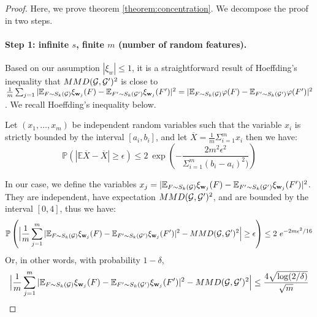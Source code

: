 \begin{proof}
Here, we prove theorem \ref{theorem:concentration}. We decompose the proof in two steps.

\paragraph{Step 1: infinite $s$, finite $m$ (number of random features).} Based on our assumption $|\xi_w|\leq 1$, it is a straightforward result of Hoeffding's inequality that  $MMD(\mathcal{G}, \mathcal{G}')^2$ is close to $\frac{1}{m} \sum_{j=1} | \mathbb{E}_{F \sim S_k(\mathcal{G})} \xi_{\mathbf{w}_j}(F) - \mathbb{E}_{F' \sim S_k(\mathcal{G}')} \xi_{\mathbf{w}_j}(F') |^2 = | \mathbb{E}_{F \sim S_k(\mathcal{G})} \varphi(F) - \mathbb{E}_{F' \sim S_k(\mathcal{G}')} \varphi(F') |^2$. We recall Hoeffding's inequality below.
\begin{lemma} 
Let $(x_1,\ldots, x_m)$ be independent random variables such that the variable $x_i$ is strictly bounded by the interval $[a_i , b_i]$, and let $\overline{X}=\frac{1}{m}\Sigma_{i=1}^{m}x_i$ then we have:
\begin{equation}
\label{eq:Hoeffding}
    \mathbb{P}(|\mathbb{E}\overline{X}-\overline{X}|\geq \epsilon)\leq 2~ \exp \left(-\frac{2m^2\epsilon^2}{\Sigma_{i=1}^m(b_i-a_i)^2)} \right)
\end{equation}
\end{lemma}
In our case, we define the variables $x_j=| \mathbb{E}_{F \sim S_k(\mathcal{G})} \xi_{\mathbf{w}_j}(F) - \mathbb{E}_{F' \sim S_k(\mathcal{G}')} \xi_{\mathbf{w}_j}(F') |^2$. They are independent, have expectation $MMD(\mathcal{G},\mathcal{G}')^2$, and are bounded by the interval $[0,4]$, thus we have:
\begin{equation*}
    \mathbb{P}\left(\Big|\frac{1}{m} \sum_{j=1}^m | \mathbb{E}_{F \sim S_k(\mathcal{G})} \xi_{\mathbf{w}_j}(F) - \mathbb{E}_{F' \sim S_k(\mathcal{G}')} \xi_{\mathbf{w}_j}(F') |^2 - MMD(\mathcal{G},\mathcal{G}')^2 \Big| \geq \epsilon\right) \leq 2~ e^{ -2m\epsilon^2/16}
\end{equation*}
Or, in other words, with probability $1-\delta$,
\begin{equation}\label{eq:step1}
\Big|\frac{1}{m} \sum_{j=1}^m | \mathbb{E}_{F \sim S_k(\mathcal{G})} \xi_{\mathbf{w}_j}(F) - \mathbb{E}_{F' \sim S_k(\mathcal{G}')} \xi_{\mathbf{w}_j}(F') |^2 - MMD(\mathcal{G},\mathcal{G}')^2 \Big| \leq \frac{4 \sqrt{\log (2/\delta)}}{\sqrt{m}}
\end{equation}


\end{proof}
